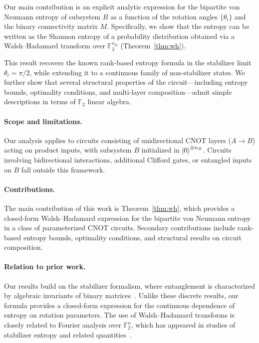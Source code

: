 \documentclass[11pt,a4paper]{article}
\newcommand{\F}{\mathbb{F}}
\begin{document}
Our main contribution is an explicit analytic expression for the bipartite von
Neumann entropy of subsystem $B$ as a function of the rotation angles
$\{\theta_i\}$ and the binary connectivity matrix $M$.  Specifically, we show
that the entropy can be written as the Shannon entropy of a probability
distribution obtained via a Walsh--Hadamard transform over $\F_2^{n_B}$
(Theorem~\ref{thm:wh}).

This result recovers the known rank-based entropy formula in the stabilizer
limit $\theta_i = \pi/2$, while extending it to a continuous family of
non-stabilizer states.  We further show that several structural properties of
the circuit---including entropy bounds, optimality conditions, and multi-layer
composition---admit simple descriptions in terms of $\F_2$ linear algebra.

\paragraph{Scope and limitations.}
Our analysis applies to circuits consisting of unidirectional CNOT layers
($A \to B$) acting on product inputs, with subsystem $B$ initialized in
$\ket{0}^{\otimes n_B}$.  Circuits involving bidirectional interactions,
additional Clifford gates, or entangled inputs on $B$ fall outside this
framework.

\paragraph{Contributions.}
The main contribution of this work is Theorem~\ref{thm:wh}, which provides a
closed-form Walsh--Hadamard expression for the bipartite von Neumann entropy in
a class of parameterized CNOT circuits.  Secondary contributions include
rank-based entropy bounds, optimality conditions, and structural results on
circuit composition.

\paragraph{Relation to prior work.}
Our results build on the stabilizer formalism, where entanglement is
characterized by algebraic invariants of binary
matrices~\cite{audenaert2005entanglement,fattal2004entanglement}.  Unlike
these discrete results, our formula provides a closed-form expression for the
continuous dependence of entropy on rotation parameters.  The use of
Walsh--Hadamard transforms is closely related to Fourier analysis over
$\F_2^n$, which has appeared in studies of stabilizer entropy and related
quantities~\cite{bataille2022cnot,goodenough2024stabilizer}.
\end{document}
